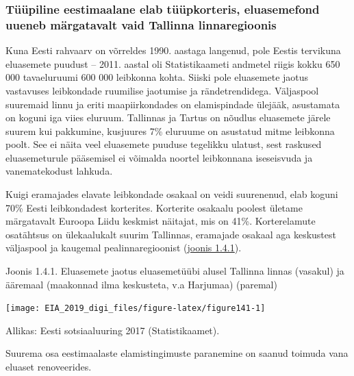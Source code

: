\documentclass[estonian,]{article}
\begin{document}
\hypertarget{tuxfcuxfcpiline-eestimaalane-elab-tuxfcuxfcpkorteris-eluasemefond-uueneb-muxe4rgatavalt-vaid-tallinna-linnaregioonis}{%
\subsubsection*{Tüüpiline eestimaalane elab tüüpkorteris, eluasemefond uueneb märgatavalt vaid Tallinna linnaregioonis}\label{tuxfcuxfcpiline-eestimaalane-elab-tuxfcuxfcpkorteris-eluasemefond-uueneb-muxe4rgatavalt-vaid-tallinna-linnaregioonis}}

Kuna Eesti rahvaarv on võrreldes 1990. aastaga langenud, pole Eestis tervikuna eluasemete puudust -- 2011. aastal oli Statistikaameti andmetel riigis kokku 650 000 tavaeluruumi 600 000 leibkonna kohta. Siiski pole eluasemete jaotus vastavuses leibkondade ruumilise jaotumise ja rändetrendidega. Väljaspool suuremaid linnu ja eriti maapiirkondades on elamispindade ülejääk, asustamata on koguni iga viies eluruum. Tallinnas ja Tartus on nõudlus eluasemete järele suurem kui pakkumine, kusjuures 7\% eluruume on asustatud mitme leibkonna poolt. See ei näita veel eluasemete puuduse tegelikku ulatust, sest raskused eluasemeturule pääsemisel ei võimalda noortel leibkonnana iseseisvuda ja vanematekodust lahkuda.

Kuigi eramajades elavate leibkondade osakaal on veidi suurenenud, elab koguni 70\% Eesti leibkondadest korterites. Korterite osakaalu poolest ületame märgatavalt Euroopa Liidu keskmist näitajat, mis on 41\%. Korterelamute osatähtsus on ülekaalukalt suurim Tallinnas, eramajade osakaal aga keskustest väljaspool ja kaugemal pealinnaregioonist (\protect\hyperlink{figure141}{joonis 1.4.1}).

{Joonis 1.4.1.} Eluasemete jaotus eluasemetüübi alusel Tallinna linnas (vasakul) ja ääremaal (maakonnad ilma keskusteta, v.a Harjumaa) (paremal)

\begin{center}\texttt{[image: EIA\_2019\_digi\_files/figure-latex/figure141-1]} \end{center}

\begin{imgsource}
{Allikas:} Eesti sotsiaaluuring 2017 (Statistikaamet).
\end{imgsource}

\begin{blockquote-right}
Suurema osa eestimaalaste elamistingimuste paranemine on saanud toimuda
vana eluaset renoveerides.
\end{blockquote-right}
\end{document}
